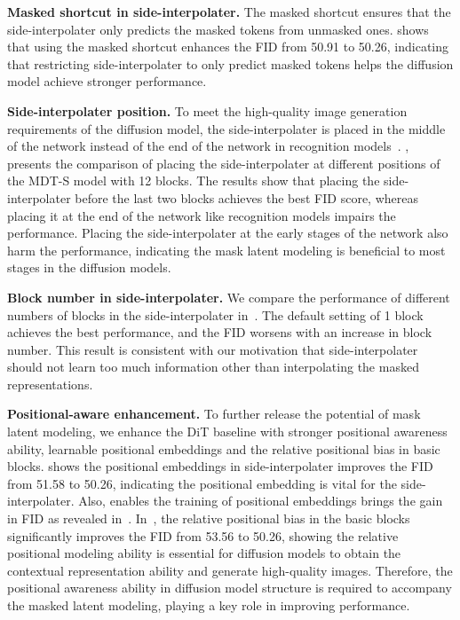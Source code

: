 \documentclass[final]{cvpr}
\newcommand{\myPara}[1]{\vspace{.08in} \noindent\textbf{#1}}
\begin{document}
\myPara{Masked shortcut in side-interpolater.}
The masked shortcut ensures that  the side-interpolater only predicts the
masked tokens from unmasked ones. 
 shows
that using the masked shortcut enhances the FID
from 50.91 to 50.26,
indicating that restricting side-interpolater
to only predict masked tokens helps the diffusion model achieve stronger performance.

\myPara{Side-interpolater position.}
To meet the high-quality image generation requirements of the diffusion model,
the side-interpolater is placed
in the middle of the network instead
of the end of the network in recognition models~\cite{he2022masked, bao2021beit}.
,
presents the comparison of placing 
the side-interpolater
at  different positions of the MDT-S model
with 12 blocks.
The results show that placing the side-interpolater before the last two blocks achieves the best FID score,
whereas placing it at the end of the network like recognition models impairs the performance.
Placing the side-interpolater at
the early stages of the network also harm the performance,
indicating the mask latent modeling 
is beneficial to most stages in the diffusion models.

\myPara{Block number in side-interpolater.}
We compare the performance of different numbers of blocks in the side-interpolater
in~.
The default setting of 1 block achieves the best performance,
and the FID worsens with an increase in block number.
This result is consistent with our motivation that side-interpolater
should not learn too much information other than interpolating the masked representations.

\myPara{Positional-aware enhancement.}
To further release the potential of mask latent modeling,
we enhance the DiT baseline with stronger positional awareness ability,
\ie learnable positional embeddings and the relative positional bias in basic blocks.
 shows the positional embeddings in side-interpolater
improves the FID from 51.58 to 50.26, indicating the positional embedding
is vital for the side-interpolater.
Also, enables the training of positional embeddings brings
the gain in FID as revealed in~.
In~,
the relative positional bias in the basic blocks significantly improves
the FID from 53.56 to 50.26, showing
the relative positional modeling ability is essential
for diffusion models to obtain the contextual representation ability
and generate high-quality images.
Therefore, the positional awareness ability in diffusion model structure
is required to accompany the masked latent modeling,
playing a key role in improving performance.
\end{document}

